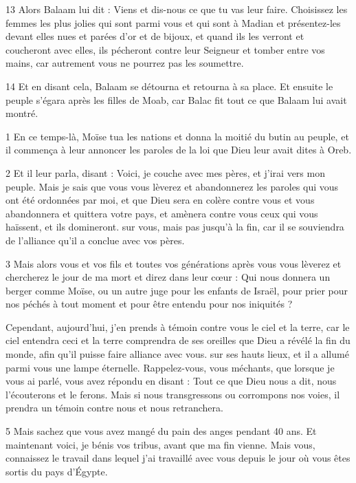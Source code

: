 \par 13 Alors Balaam lui dit : Viens et dis-nous ce que tu vas leur faire. Choisissez les femmes les plus jolies qui sont parmi vous et qui sont à Madian et présentez-les devant elles nues et parées d'or et de bijoux, et quand ils les verront et coucheront avec elles, ils pécheront contre leur Seigneur et tomber entre vos mains, car autrement vous ne pourrez pas les soumettre.

\par 14 Et en disant cela, Balaam se détourna et retourna à sa place. Et ensuite le peuple s'égara après les filles de Moab, car Balac fit tout ce que Balaam lui avait montré.


\par 1 En ce temps-là, Moïse tua les nations et donna la moitié du butin au peuple, et il commença à leur annoncer les paroles de la loi que Dieu leur avait dites à Oreb.

\par 2 Et il leur parla, disant : Voici, je couche avec mes pères, et j'irai vers mon peuple. Mais je sais que vous vous lèverez et abandonnerez les paroles qui vous ont été ordonnées par moi, et que Dieu sera en colère contre vous et vous abandonnera et quittera votre pays, et amènera contre vous ceux qui vous haïssent, et ils domineront. sur vous, mais pas jusqu'à la fin, car il se souviendra de l'alliance qu'il a conclue avec vos pères.

\par 3 Mais alors vous et vos fils et toutes vos générations après vous vous lèverez et chercherez le jour de ma mort et direz dans leur cœur : Qui nous donnera un berger comme Moïse, ou un autre juge pour les enfants de Israël, pour prier pour nos péchés à tout moment et pour être entendu pour nos iniquités ?

\par Cependant, aujourd'hui, j'en prends à témoin contre vous le ciel et la terre, car le ciel entendra ceci et la terre comprendra de ses oreilles que Dieu a révélé la fin du monde, afin qu'il puisse faire alliance avec vous. sur ses hauts lieux, et il a allumé parmi vous une lampe éternelle. Rappelez-vous, vous méchants, que lorsque je vous ai parlé, vous avez répondu en disant : Tout ce que Dieu nous a dit, nous l'écouterons et le ferons. Mais si nous transgressons ou corrompons nos voies, il prendra un témoin contre nous et nous retranchera.

\par 5 Mais sachez que vous avez mangé du pain des anges pendant 40 ans. Et maintenant voici, je bénis vos tribus, avant que ma fin vienne. Mais vous, connaissez le travail dans lequel j'ai travaillé avec vous depuis le jour où vous êtes sortis du pays d'Égypte.

